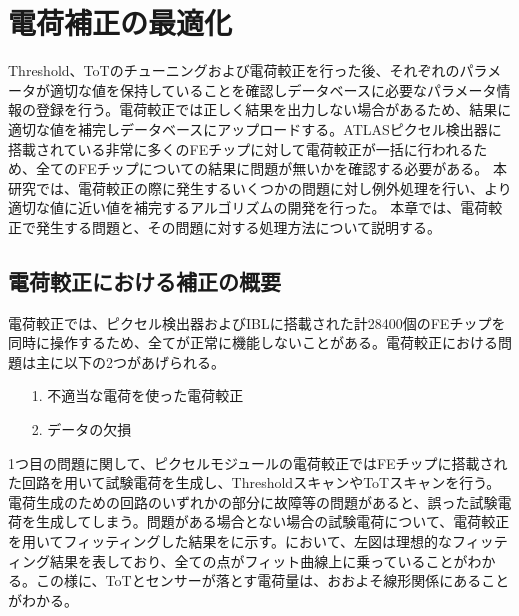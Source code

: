 \chapter{電荷補正の最適化}
\label{sec:chap4}
Threshold、ToTのチューニングおよび電荷較正を行った後、それぞれのパラメータが適切な値を保持していることを確認しデータベースに必要なパラメータ情報の登録を行う。電荷較正では正しく結果を出力しない場合があるため、結果に適切な値を補完しデータベースにアップロードする。ATLASピクセル検出器に搭載されている非常に多くのFEチップに対して電荷較正が一括に行われるため、全てのFEチップについての結果に問題が無いかを確認する必要がある。
本研究では、電荷較正の際に発生するいくつかの問題に対し例外処理を行い、より適切な値に近い値を補完するアルゴリズムの開発を行った。
本章では、電荷較正で発生する問題と、その問題に対する処理方法について説明する。

\section{電荷較正における補正の概要}
\label{sec:hoseigaiyou}

電荷較正では、ピクセル検出器およびIBLに搭載された計28400個のFEチップを同時に操作するため、全てが正常に機能しないことがある。電荷較正における問題は主に以下の2つがあげられる。

\begin{itemize}
  \item[1. ] 不適当な電荷を使った電荷較正
  \item[2. ] データの欠損
\end{itemize}

1つ目の問題に関して、ピクセルモジュールの電荷較正ではFEチップに搭載された回路を用いて試験電荷を生成し、ThresholdスキャンやToTスキャンを行う。電荷生成のための回路のいずれかの部分に故障等の問題があると、誤った試験電荷を生成してしまう。問題がある場合とない場合の試験電荷について、電荷較正を用いてフィッティングした結果をに示す。において、左図は理想的なフィッティング結果を表しており、全ての点がフィット曲線上に乗っていることがわかる。この様に、ToTとセンサーが落とす電荷量は、おおよそ線形関係にあることがわかる。


